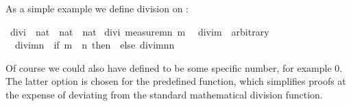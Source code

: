 \begin{isabellebody}
\begin{isamarkuptext}
As a simple example we define division on :%
\end{isamarkuptext}%
\isamarkuptrue%
\ divi\ {\isacharcolon}{\isacharcolon}\ {\isachardoublequote}nat\ {\isasymtimes}\ nat\ {\isasymRightarrow}\ nat{\isachardoublequote}\isanewline
\isamarkupfalse%
\ divi\ {\isachardoublequote}measure{\isacharparenleft}{\isasymlambda}{\isacharparenleft}m{\isacharcomma}n{\isacharparenright}{\isachardot}\ m{\isacharparenright}{\isachardoublequote}\isanewline
\ \ {\isachardoublequote}divi{\isacharparenleft}m{\isacharcomma}{}{\isacharparenright}\ {\isacharequal}\ arbitrary{\isachardoublequote}\isanewline
\ \ {\isachardoublequote}divi{\isacharparenleft}m{\isacharcomma}n{\isacharparenright}\ {\isacharequal}\ {\isacharparenleft}if\ m\ {\isacharless}\ n\ then\ {}\ else\ divi{\isacharparenleft}m{\isacharminus}n{\isacharcomma}n{\isacharparenright}{\isacharplus}{}{\isacharparenright}{\isachardoublequote}\isamarkupfalse%
%
\begin{isamarkuptext}%
\noindent Of course we could also have defined
 to be some specific number, for example 0. The
latter option is chosen for the predefined  function, which
simplifies proofs at the expense of deviating from the
standard mathematical division function.


\end{isamarkuptext}
\end{isabellebody}
